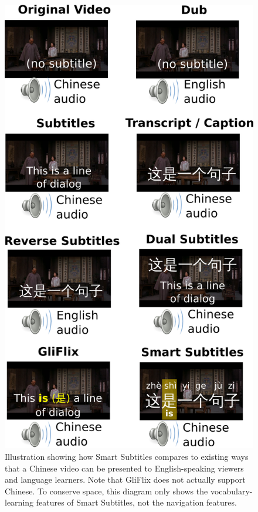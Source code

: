 \documentclass{sigchi}
\begin{document}
\begin{figure}[!h]
\centering
\includegraphics[width=\columnwidth]{subtitle-types-2column}
\caption{Illustration showing how Smart Subtitles
compares to existing ways that a Chinese video can be presented
to English-speaking viewers and language learners.
Note that GliFlix does not actually support Chinese.
To conserve space, this diagram only shows the vocabulary-learning features of Smart Subtitles, not the navigation features.}
\label{fig:figure2}
\end{figure}
\end{document}
